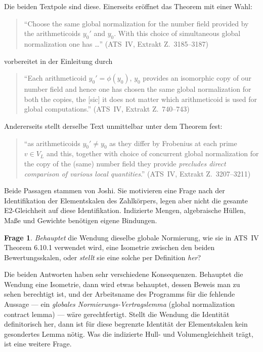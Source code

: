 \documentclass[11pt,a4paper]{article}
\theoremstyle{definition}
\newtheorem{question}{Frage}
\theoremstyle{plain}
\theoremstyle{definition}
\newcommand{\anchor}[2]{(#1, Extrakt Z.~#2)}
\begin{document}
Die beiden Textpole sind diese. Einerseits eröffnet das Theorem mit einer Wahl:

\begin{quote}\small
``Choose the same global normalization for the number field provided by the
arithmeticoids $y_0'$ and $y_0$. With this choice of simultaneous global
normalization one has \ldots'' \hfill\anchor{ATS~IV}{3185--3187}
\end{quote}

vorbereitet in der Einleitung durch

\begin{quote}\small
``Each arithmeticoid $y_0' = \phi(y_0)$, $y_0$ provides an isomorphic copy of our
number field and hence one has chosen the same global normalization for both the
copies, the [sic] it does not matter which arithmeticoid is used for global
computations.'' \hfill\anchor{ATS~IV}{740--743}
\end{quote}

Andererseits stellt derselbe Text unmittelbar unter dem Theorem fest:

\begin{quote}\small
``as arithmeticoids $y_0' \neq y_0$ as they differ by Frobenius at each prime
$v \in V_L$ and this, together with choice of concurrent global normalization for
the copy of the (same) number field they provide \emph{precludes direct comparison
of various local quantities}.'' \hfill\anchor{ATS~IV}{3207--3211}
\end{quote}

Beide Passagen stammen von Joshi. Sie motivieren eine Frage nach der
Identifikation der Elementskalen des Zahlkörpers, legen aber nicht die gesamte
E2-Gleichheit auf diese Identifikation. Indizierte Mengen, algebraische
Hüllen, Maße und Gewichte benötigen eigene Bindungen.

\begin{question}\label{q:main}
\emph{Behauptet} die Wendung \glqq dieselbe globale Normierung\grqq{}, wie sie in
ATS~IV Theorem 6.10.1 verwendet wird, eine Isometrie zwischen den beiden
Bewertungsskalen, oder \emph{stellt} sie eine solche per Definition \emph{her}?
\end{question}

Die beiden Antworten haben sehr verschiedene Konsequenzen. Behauptet die Wendung
eine Isometrie, dann wird etwas behauptet, dessen Beweis man zu sehen berechtigt
ist, und der Arbeitsname des Programms für die fehlende Aussage --- ein
\emph{globales Normierungs-Vertragslemma} (global normalization contract lemma)
--- wäre gerechtfertigt. Stellt die Wendung die Identität definitorisch her, dann
ist für diese begrenzte Identität der Elementskalen kein gesondertes Lemma
nötig. Was die indizierte Hull- und Volumengleichheit trägt, ist eine weitere
Frage.
\end{document}
